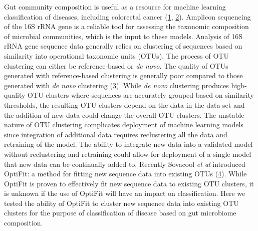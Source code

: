 \documentclass[
]{article}
\begin{document}
\newpage

Gut community composition is useful as a resource for machine learning
classification of diseases, including colorectal cancer
(\protect\hyperlink{ref-baxter2016}{1},
\protect\hyperlink{ref-zackular2014}{2}). Amplicon sequencing of the 16S
rRNA gene is a reliable tool for assessing the taxonomic composition of
microbial communities, which is the input to these models. Analysis of
16S rRNA gene sequence data generally relies on clustering of sequences
based on similarity into operational taxonomic units (OTUs). The process
of OTU clustering can either be reference-based or \emph{de novo}. The
quality of OTUs generated with reference-based clustering is generally
poor compared to those generated with \emph{de novo} clustering
(\protect\hyperlink{ref-westcott2015}{3}). While \emph{de novo}
clustering produces high-quality OTU clusters where sequences are
accurately grouped based on similarity thresholds, the resulting OTU
clusters depend on the data in the data set and the addition of new data
could change the overall OTU clusters. The unstable nature of OTU
clustering complicates deployment of machine learning models since
integration of additional data requires reclustering all the data and
retraining of the model. The ability to integrate new data into a
validated model without reclustering and retraining could allow for
deployment of a single model that new data can be continually added to.
Recently Sovacool \emph{et al} introduced OptiFit: a method for fitting
new sequence data into existing OTUs
(\protect\hyperlink{ref-sovacool2022}{4}). While OptiFit is proven to
effectively fit new sequence data to existing OTU clusters, it is
unknown if the use of OptiFit will have an impact on classification.
Here we tested the ability of OptiFit to cluster new sequence data into
existing OTU clusters for the purpose of classification of disease based
on gut microbiome composition.
\end{document}
